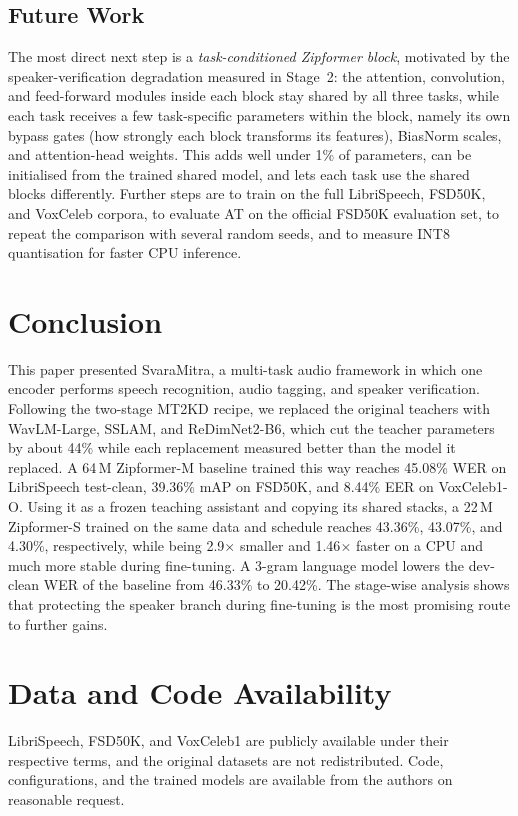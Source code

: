 \documentclass[lettersize,journal]{IEEEtran}
\newcommand{\method}{SvaraMitra}                    %
\begin{document}
\subsection{Future Work}
The most direct next step is a \emph{task-conditioned Zipformer block}, motivated by the speaker-verification
degradation measured in Stage~2: the attention, convolution, and feed-forward modules inside each block stay shared
by all three tasks, while each task receives a few task-specific parameters within the block, namely its own bypass
gates (how strongly each block transforms its features), BiasNorm scales, and attention-head weights. This adds well
under 1\% of parameters, can be initialised from the trained shared model, and lets each task use the shared blocks
differently. Further steps are to train on the full LibriSpeech, FSD50K, and VoxCeleb corpora, to evaluate AT on the
official FSD50K evaluation set, to repeat the comparison with several random seeds, and to measure INT8 quantisation
for faster CPU inference.

\section{Conclusion}\label{sec:conclusion}
This paper presented \method{}, a multi-task audio framework in which one encoder performs speech recognition, audio
tagging, and speaker verification. Following the two-stage MT2KD recipe, we replaced the original teachers with
WavLM-Large, SSLAM, and ReDimNet2-B6, which cut the teacher parameters by about 44\% while each replacement measured
better than the model it replaced. A 64\,M Zipformer-M baseline trained this way reaches 45.08\% WER on LibriSpeech
test-clean, 39.36\% mAP on FSD50K, and 8.44\% EER on VoxCeleb1-O. Using it as a frozen teaching assistant and copying
its shared stacks, a 22\,M Zipformer-S trained on the same data and schedule reaches 43.36\%, 43.07\%, and 4.30\%,
respectively, while being 2.9$\times$ smaller and 1.46$\times$ faster on a CPU and much more stable during
fine-tuning. A 3-gram language model lowers the dev-clean WER of the baseline from 46.33\% to 20.42\%. The stage-wise
analysis shows that protecting the speaker branch during fine-tuning is the most promising route to further gains.

\section*{Data and Code Availability}
LibriSpeech, FSD50K, and VoxCeleb1 are publicly available under their respective terms, and the original datasets are
not redistributed. Code, configurations, and the trained models are available from the authors on reasonable request.
\end{document}
